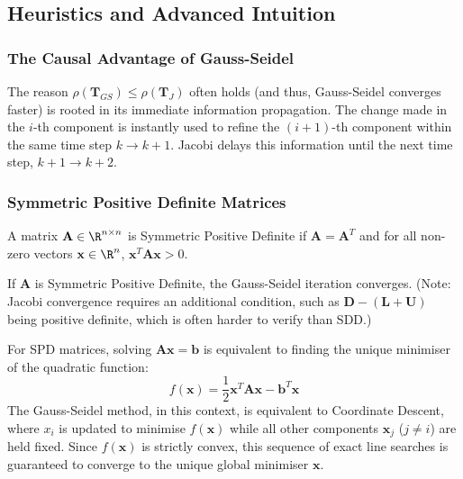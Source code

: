 \subsection{Heuristics and Advanced Intuition}

\subsubsection{The Causal Advantage of Gauss-Seidel}

The reason $\rho(\mathbf{T}_{GS}) \le \rho(\mathbf{T}_J)$ often holds (and thus, Gauss-Seidel converges faster) is rooted in its immediate information propagation. The change made in the $i$-th component is instantly used to refine the $(i+1)$-th component within the same time step $k \to k+1$. Jacobi delays this information until the next time step, $k+1 \to k+2$.

\subsubsection{Symmetric Positive Definite Matrices}

\begin{definition}
A matrix $\mathbf{A} \in \R^{n \times n}$ is Symmetric Positive Definite if $\mathbf{A} = \mathbf{A}^T$ and for all non-zero vectors $\mathbf{x} \in \R^n$, $\mathbf{x}^T \mathbf{A} \mathbf{x} > 0$.
\end{definition}

\begin{theorem}
If $\mathbf{A}$ is Symmetric Positive Definite, the Gauss-Seidel iteration converges. (Note: Jacobi convergence requires an additional condition, such as $\mathbf{D} - (\mathbf{L}+\mathbf{U})$ being positive definite, which is often harder to verify than SDD.)
\end{theorem}
\begin{remark}
For SPD matrices, solving $\mathbf{A}\mathbf{x} = \mathbf{b}$ is equivalent to finding the unique minimiser of the quadratic function:
\[ f(\mathbf{x}) = \frac{1}{2}\mathbf{x}^T \mathbf{A} \mathbf{x} - \mathbf{b}^T \mathbf{x} \]
The Gauss-Seidel method, in this context, is equivalent to Coordinate Descent, where $x_i$ is updated to minimise $f(\mathbf{x})$ while all other components $\mathbf{x}_j$ ($j \ne i$) are held fixed. Since $f(\mathbf{x})$ is strictly convex, this sequence of exact line searches is guaranteed to converge to the unique global minimiser $\mathbf{x}$.
\end{remark}

